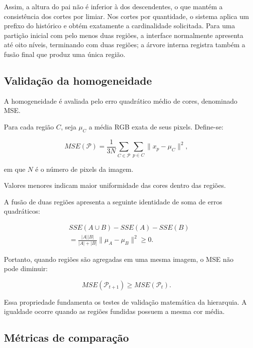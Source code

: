 \documentclass[12pt]{article}
\begin{document}
Assim, a altura do pai não é inferior à dos descendentes, o que mantém
a consistência dos cortes por limiar. Nos cortes por quantidade,
o sistema aplica um prefixo do histórico e obtém exatamente a
cardinalidade solicitada. Para uma partição inicial com pelo menos
duas regiões, a interface normalmente apresenta até oito níveis,
terminando com duas regiões; a árvore interna registra também
a fusão final que produz uma única região.

\subsection{Validação da homogeneidade}

A homogeneidade é avaliada pelo erro quadrático
médio de cores, denominado MSE.

Para cada região $C$, seja $\mu_C$ a média RGB
exata de seus pixels. Define-se:

\begin{equation}
MSE(\mathcal{P})=
\frac{1}{3N}
\sum_{C\in\mathcal{P}}
\sum_{p\in C}
\|x_p-\mu_C\|^2,
\label{eq:mse}
\end{equation}

em que $N$ é o número de pixels da imagem.

Valores menores indicam maior uniformidade
das cores dentro das regiões.

A fusão de duas regiões apresenta a seguinte
identidade de soma de erros quadráticos:

\begin{equation}
\begin{split}
&SSE(A\cup B)-SSE(A)-SSE(B)\\
&=\frac{|A||B|}{|A|+|B|}
\|\mu_A-\mu_B\|^2\geq 0.
\end{split}
\label{eq:sse}
\end{equation}

Portanto, quando regiões são agregadas em uma
mesma imagem, o MSE não pode diminuir:

\begin{equation}
MSE(\mathcal{P}_{t+1})
\geq MSE(\mathcal{P}_t).
\label{eq:monotonicidade}
\end{equation}

Essa propriedade fundamenta os testes de
validação matemática da hierarquia.
A igualdade ocorre quando as regiões fundidas
possuem a mesma cor média.

\subsection{Métricas de comparação}
\end{document}

